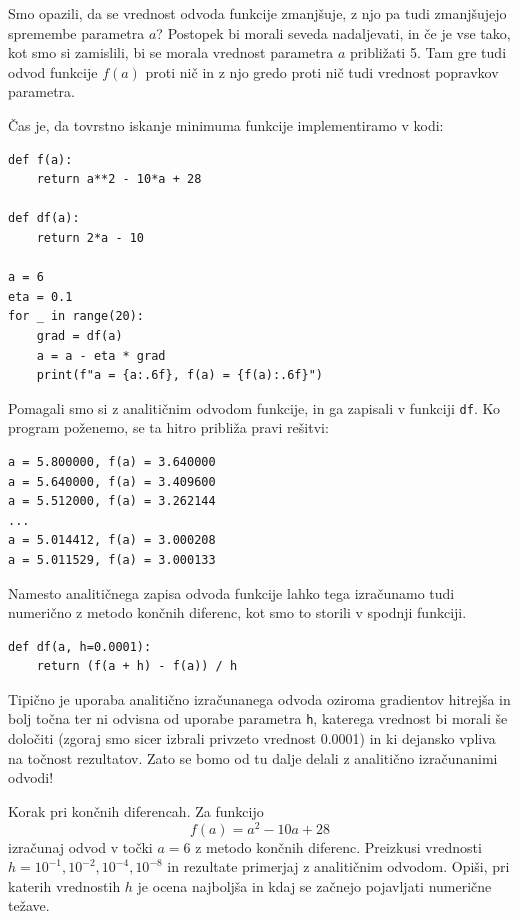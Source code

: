 Smo opazili, da se vrednost odvoda funkcije zmanjšuje, z njo pa tudi zmanjšujejo spremembe parametra $a$? Postopek bi morali seveda nadaljevati, in če je vse tako, kot smo si zamislili, bi se morala vrednost parametra $a$ približati 5. Tam gre tudi odvod funkcije $f(a)$ proti nič in z njo gredo proti nič tudi vrednost popravkov parametra.

Čas je, da tovrstno iskanje minimuma funkcije implementiramo v kodi:

\vspace*{3mm}
\begin{lstlisting}
def f(a):
    return a**2 - 10*a + 28

def df(a):
    return 2*a - 10

a = 6
eta = 0.1
for _ in range(20):
    grad = df(a)
    a = a - eta * grad
    print(f"a = {a:.6f}, f(a) = {f(a):.6f}")
\end{lstlisting}

Pomagali smo si z analitičnim odvodom funkcije, in ga zapisali v funkciji \texttt{df}. Ko program poženemo, se ta hitro približa pravi rešitvi:

\vspace*{3mm}
\begin{lstlisting}
a = 5.800000, f(a) = 3.640000
a = 5.640000, f(a) = 3.409600
a = 5.512000, f(a) = 3.262144
...
a = 5.014412, f(a) = 3.000208
a = 5.011529, f(a) = 3.000133
\end{lstlisting}

Namesto analitičnega zapisa odvoda funkcije lahko tega izračunamo tudi numerično z metodo končnih diferenc, kot smo to storili v spodnji funkciji.
\vspace*{3mm}
\begin{lstlisting}
def df(a, h=0.0001):
    return (f(a + h) - f(a)) / h
\end{lstlisting}

\noindent Tipično je uporaba analitično izračunanega odvoda oziroma gradientov hitrejša in bolj točna ter ni odvisna od uporabe parametra \texttt{h}, katerega vrednost bi morali še določiti (zgoraj smo sicer izbrali privzeto vrednost 0.0001) in ki dejansko vpliva na točnost rezultatov. Zato se bomo od tu dalje delali z analitično izračunanimi odvodi!

\begin{exercise}{Korak pri končnih diferencah.}
Za funkcijo
\[
f(a)=a^2-10a+28
\]
izračunaj odvod v točki $a=6$ z metodo končnih diferenc. Preizkusi vrednosti $h=10^{-1},10^{-2},10^{-4},10^{-8}$ in rezultate primerjaj z analitičnim odvodom. Opiši, pri katerih vrednostih $h$ je ocena najboljša in kdaj se začnejo pojavljati numerične težave.
\end{exercise}

